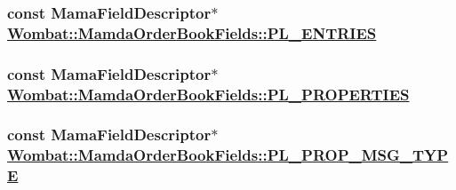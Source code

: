 \hypertarget{classWombat_1_1MamdaOrderBookFields_2c227acb5e43bb610ec0747306777e68}{
\subsubsection[PL\_\-ENTRIES]{\setlength{\rightskip}{0pt plus 5cm}const Mama\-Field\-Descriptor$\ast$ \hyperlink{classWombat_1_1MamdaOrderBookFields_2c227acb5e43bb610ec0747306777e68}{Wombat::Mamda\-Order\-Book\-Fields::PL\_\-ENTRIES}}}
\label{classWombat_1_1MamdaOrderBookFields_2c227acb5e43bb610ec0747306777e68}


\hypertarget{classWombat_1_1MamdaOrderBookFields_90ad84e33b7423bae56802bd55dbdf97}{
\subsubsection[PL\_\-PROPERTIES]{\setlength{\rightskip}{0pt plus 5cm}const Mama\-Field\-Descriptor$\ast$ \hyperlink{classWombat_1_1MamdaOrderBookFields_90ad84e33b7423bae56802bd55dbdf97}{Wombat::Mamda\-Order\-Book\-Fields::PL\_\-PROPERTIES}}}
\label{classWombat_1_1MamdaOrderBookFields_90ad84e33b7423bae56802bd55dbdf97}


\hypertarget{classWombat_1_1MamdaOrderBookFields_0dd719edd812c3557d3503c4aad7e687}{
\subsubsection[PL\_\-PROP\_\-MSG\_\-TYPE]{\setlength{\rightskip}{0pt plus 5cm}const Mama\-Field\-Descriptor$\ast$ \hyperlink{classWombat_1_1MamdaOrderBookFields_0dd719edd812c3557d3503c4aad7e687}{Wombat::Mamda\-Order\-Book\-Fields::PL\_\-PROP\_\-MSG\_\-TYPE}}}
\label{classWombat_1_1MamdaOrderBookFields_0dd719edd812c3557d3503c4aad7e687}


